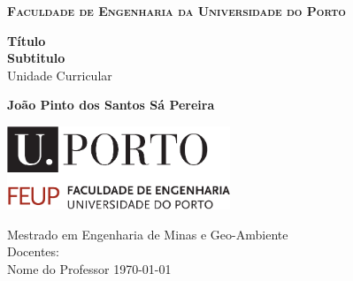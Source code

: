 \begin{titlepage}
    \setlength{\headheight}{14pt}
    \begin{center}
        \large
        \Large\textbf{{\scshape Faculdade de Engenharia da Universidade do Porto}}
        \vspace*{1.8cm}

        \huge
        \textbf{Título}\\
        \textbf{Subtitulo} \\
        \vspace{0.5cm}
        \LARGE
        Unidade Curricular

        \vspace{1cm}
        \Large
        \textbf{João Pinto dos Santos Sá Pereira}

        \vspace{3cm}

        \includegraphics[width=0.5\textwidth]{imagens/uporto-feup.pdf}
        \vspace{2cm}

        \large
        Mestrado em Engenharia de Minas e Geo-Ambiente\\
        \vspace{0.5cm}
        Docentes:\\
        Nome do Professor
        \vfill
        \today

    \end{center}
\end{titlepage}
